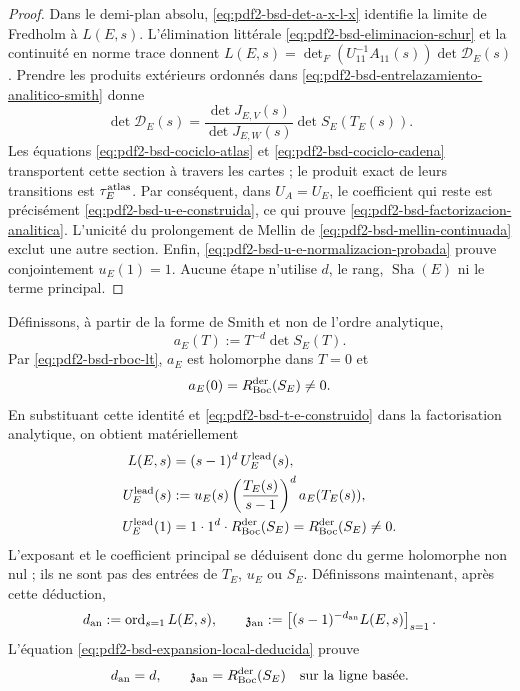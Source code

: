 \begin{proof}
Dans le demi-plan absolu,
\eqref{eq:pdf2-bsd-det-a-x-l-x} identifie la limite de Fredholm à $L(E,s)$.
L'élimination littérale \eqref{eq:pdf2-bsd-eliminacion-schur} et la continuité
en norme trace donnent
$L(E,s)=\det_F(U_{11}^{-1}A_{11}(s))\det\mathscr D_E(s)$.
Prendre les produits extérieurs ordonnés dans
\eqref{eq:pdf2-bsd-entrelazamiento-analitico-smith} donne
\[
 \det\mathscr D_E(s)
 =\frac{\det J_{E,V}(s)}
        {\det J_{E,W}(s)}
   \det S_E(T_E(s)).
\]
Les équations \eqref{eq:pdf2-bsd-cociclo-atlas} et
\eqref{eq:pdf2-bsd-cociclo-cadena} transportent cette section à travers les cartes ;
le produit exact de leurs transitions est $\tau_E^{\rm atlas}$. Par conséquent, dans
$U_A=U_E$, le coefficient qui reste est précisément
\eqref{eq:pdf2-bsd-u-e-construida}, ce qui prouve
\eqref{eq:pdf2-bsd-factorizacion-analitica}. L'unicité du prolongement de
Mellin de \eqref{eq:pdf2-bsd-mellin-continuada} exclut une autre section. Enfin,
\eqref{eq:pdf2-bsd-u-e-normalizacion-probada} prouve conjointement
$u_E(1)=1$. Aucune étape n'utilise $d$, le rang, $\operatorname{Sha}(E)$ ni le
terme principal.
\end{proof}

Définissons, à partir de la forme de Smith et non de l'ordre analytique,
\begin{equation}\label{eq:pdf2-bsd-a-e-smith}
 a_E(T):=T^{-d}\det S_E(T).
\end{equation}
Par \eqref{eq:pdf2-bsd-rboc-lt}, $a_E$ est holomorphe dans $T=0$ et
\begin{equation}\label{eq:pdf2-bsd-a-e-cero}
 a_E(0)=R_{\rm Boc}^{\rm der}(S_E)\ne0.
\end{equation}
En substituant cette identité et
\eqref{eq:pdf2-bsd-t-e-construido} dans la factorisation analytique, on obtient
matériellement
\begin{equation}\label{eq:pdf2-bsd-expansion-local-deducida}
 \begin{aligned}
 L(E,s)
  &=(s-1)^d\,U_E^{\rm lead}(s),\\
 U_E^{\rm lead}(s)
  &:=u_E(s)
     \left(\frac{T_E(s)}{s-1}\right)^d
     a_E(T_E(s)),\\
 U_E^{\rm lead}(1)
  &=1\cdot1^d\cdot R_{\rm Boc}^{\rm der}(S_E)
   =R_{\rm Boc}^{\rm der}(S_E)\ne0.
 \end{aligned}
\end{equation}
L'exposant et le coefficient principal se déduisent donc du germe
holomorphe non nul ; ils ne sont pas des entrées de $T_E$, $u_E$ ou $S_E$.
Définissons maintenant, après cette déduction,
\begin{equation}\label{eq:pdf2-bsd-dan-zan}
 d_{\rm an}:=\operatorname{ord}_{s=1}L(E,s),
 \qquad
 \mathfrak z_{\rm an}:=
 \left[(s-1)^{-d_{\rm an}}L(E,s)\right]_{s=1}.
\end{equation}
L'équation \eqref{eq:pdf2-bsd-expansion-local-deducida} prouve
\begin{equation}\label{eq:pdf2-bsd-dan-d}
 d_{\rm an}=d,
 \qquad
 \mathfrak z_{\rm an}
 =R_{\rm Boc}^{\rm der}(S_E)
 \quad\text{sur la ligne basée}.
\end{equation}

